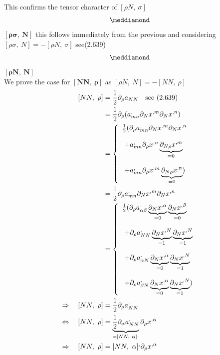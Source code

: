 This confirms the tensor character of $[ \rho N, \  \sigma] $
$$\meddiamond$$
$\boldsymbol{[ \rho \sigma, \  N]}$ this follows immediately from the previous and considering $[ \rho \sigma, \  N] = - [ \rho N, \  \sigma]$ see(2.639) \\
$$\meddiamond$$
$\boldsymbol{[\rho N, \ N ] }$\\
We prove the case for $\boldsymbol{[ NN, \ \rho ]}$  as $[\rho N, \ N ] = -[ NN, \ \rho ] $
\begin{align}
\ [ NN, \ \rho ] &= \half \partial_{\rho} a_{NN}\quad \text{see (2.639)}\\
\ &= \half \partial_{\rho} (a^{,}_{mn}\partial_{N}x^{,m}\partial_{N}x^{,n})\\
\ & = \left\{ \begin{array}{l}
\half (\partial_{\rho} a^{,}_{mn}\partial_{N}x^{,m}\partial_{N}x^{,n}\\\\
\ + a^{,}_{mn} \partial_{\rho}x^{,n} \underbrace{\partial_{N \rho}x^{,m}}_{=0}\\\\
\ + a^{,}_{mn} \partial_{\rho}x^{,m} \underbrace{\partial_{N \rho}x^{,n}}_{=0})
\end{array} \right.\\
\ &= \half \partial_{\rho} a^{,}_{mn}\partial_{N}x^{,m}\partial_{N}x^{,n}\\
\ &= \left\{ \begin{array}{l}
\half (\partial_{\rho} a^{,}_{\alpha\beta}\underbrace{\partial_{N}x^{,\alpha}}_{=0}\underbrace{\partial_{N}x^{,\beta}}_{=0}\\\\
\ +\partial_{\rho} a^{,}_{NN}\underbrace{\partial_{N}x^{,N}}_{=1}\underbrace{\partial_{N}x^{,N}}_{=1}\\\\
\ +\partial_{\rho} a^{,}_{\alpha N}\underbrace{\partial_{N}x^{,\alpha}}_{=0}\underbrace{\partial_{N}x^{,N}}_{=1}\\\\
\ +\partial_{\rho} a^{,}_{\beta N}\underbrace{\partial_{N}x^{,\alpha}}_{=0}\underbrace{\partial_{N}x^{,N}}_{=1})\\
\end{array} \right.\\
\Rightarrow \quad [ NN, \ \rho ] &= \half \partial_{\rho} a^{,}_{NN}\\
\Leftrightarrow \quad [ NN, \ \rho ] &=  \underbrace{\half \partial_{\alpha} a^{,}_{NN}}_{=[NN, \ \alpha]^,}\partial_{\rho}x^{,\alpha}\\
\Rightarrow \quad [ NN, \ \rho ] &=  [NN, \ \alpha]^, \partial_{\rho}x^{,\alpha}
\end{align}
